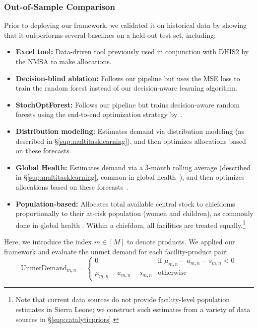 \documentclass[12pt]{article}
\begin{document}
\subsubsection{Out-of-Sample Comparison}
\label{sup:outofsample}
Prior to deploying our framework, we validated it on historical data by showing that it outperforms several baselines on a held-out test set, including:
\begin{itemize}

\item{\textbf{Excel tool:}} Data-driven tool previously used in conjunction with DHIS2 by the NMSA to make allocations.

\item{\textbf{Decision-blind ablation:}} Follows our pipeline but uses the MSE loss to train the random forest instead of our decision-aware learning algorithm.

\item{\textbf{StochOptForest:}} Follows our pipeline but trains decision-aware random forests using the end-to-end optimization strategy by~\cite{kallus2022stochastic}.

\item{\textbf{Distribution modeling:}} Estimates demand via distribution modeling (as described in \S\ref{sup:multitasklearning}), and then optimizes allocations based on these forecasts.

\item{\textbf{Global Health:}} Estimates demand via a 3-month rolling average (described in \S\ref{sup:multitasklearning}, common in global health~\cite{USAID2014HealthCommodities, Kenya2016FamilyPlanning}), and then optimizes allocations based on these forecasts~\cite{WHO}.

\item{\textbf{Population-based:}} Allocates total available central stock to chiefdoms proportionally to their at-risk population (women and children), as commonly done in global health \cite{USAID2014HealthCommodities}. Within a chiefdom, all facilities are treated equally.\footnote{Note that current data sources do not provide facility-level population estimates in Sierra Leone; we construct such estimates from a variety of data sources in \S\ref{sup:catalyticpriors}.}
\end{itemize}
Here, we introduce the index $m\in[M]$ to denote products. We applied our framework and evaluate the unmet demand for each facility-product pair:
\begin{equation} \label{eq:unmetD}
\text{UnmetDemand}_{m,n} =
\begin{cases}
0 & \text{if } \mu_{m,n} - a_{m,n} - s_{m,n} < 0 \\
\mu_{m,n} - a_{m,n} - s_{m,n} & \text{otherwise}
\end{cases}
\end{equation}
\end{document}
